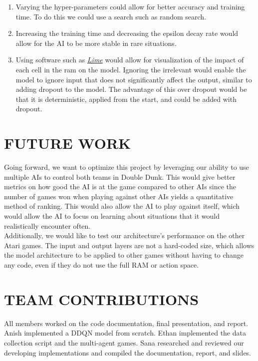 \documentclass[letterpaper, 10 pt, conference]{ieeeconf}
\begin{document}
\begin{enumerate}
    \item  Varying the hyper-parameters could allow for better accuracy and training time. To do this we could use a search such as random search. \\

    \item  Increasing the training time and decreasing the epsilon decay rate would allow for the AI to be more stable in rare situations. \\

    \item  Using software such as \href{https://github.com/marcotcr/lime/blob/master/README.md}{\textit{Lime}} would allow for visualization of the impact of each cell in the ram on the model. Ignoring the irrelevant would enable the model to ignore input that does not significantly affect the output, similar to adding dropout to the model. The advantage of this over dropout would be that it is deterministic, applied from the start, and could be added with dropout. \\
\end{enumerate}

\section{\textbf{FUTURE WORK}}
\vspace{.5cm}
Going forward, we want to optimize this project by leveraging our ability to use multiple AIs to control both teams in Double Dunk. This would give better metrics on how good the AI is at the game compared to other AIs since the number of games won when playing against other AIs yields a quantitative method of ranking. This would also allow the AI to play against itself, which would allow the AI to focus on learning about situations that it would realistically encounter often. \\

Additionally, we would like to test our architecture's performance on the other Atari games. The input and output layers are not a hard-coded size, which allows the model architecture to be applied to other games without having to change any code, even if they do not use the full RAM or action space.\\

\section{\textbf{TEAM CONTRIBUTIONS}}
\vspace{.5cm}
 All members worked on the code documentation, final presentation, and report. Anish implemented a DDQN model from scratch. Ethan implemented the data collection script and the multi-agent games. Sana researched and reviewed our developing implementations and compiled the documentation, report, and slides. \\
\end{document}
